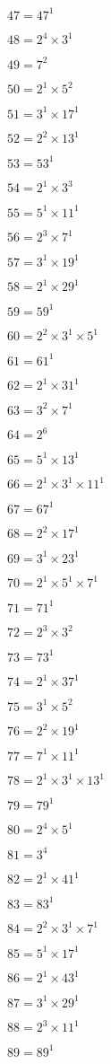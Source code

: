 $47 = 47^{1}$

$48 = 2^{4} × 3^{1}$

$49 = 7^{2}$

$50 = 2^{1} × 5^{2}$

$51 = 3^{1} × 17^{1}$

$52 = 2^{2} × 13^{1}$

$53 = 53^{1}$

$54 = 2^{1} × 3^{3}$

$55 = 5^{1} × 11^{1}$

$56 = 2^{3} × 7^{1}$

$57 = 3^{1} × 19^{1}$

$58 = 2^{1} × 29^{1}$

$59 = 59^{1}$

$60 = 2^{2} × 3^{1} × 5^{1}$

$61 = 61^{1}$

$62 = 2^{1} × 31^{1}$

$63 = 3^{2} × 7^{1}$

$64 = 2^{6}$

$65 = 5^{1} × 13^{1}$

$66 = 2^{1} × 3^{1} × 11^{1}$

$67 = 67^{1}$

$68 = 2^{2} × 17^{1}$

$69 = 3^{1} × 23^{1}$

$70 = 2^{1} × 5^{1} × 7^{1}$

$71 = 71^{1}$

$72 = 2^{3} × 3^{2}$

$73 = 73^{1}$

$74 = 2^{1} × 37^{1}$

$75 = 3^{1} × 5^{2}$

$76 = 2^{2} × 19^{1}$

$77 = 7^{1} × 11^{1}$

$78 = 2^{1} × 3^{1} × 13^{1}$

$79 = 79^{1}$

$80 = 2^{4} × 5^{1}$

$81 = 3^{4}$

$82 = 2^{1} × 41^{1}$

$83 = 83^{1}$

$84 = 2^{2} × 3^{1} × 7^{1}$

$85 = 5^{1} × 17^{1}$

$86 = 2^{1} × 43^{1}$

$87 = 3^{1} × 29^{1}$

$88 = 2^{3} × 11^{1}$

$89 = 89^{1}$

